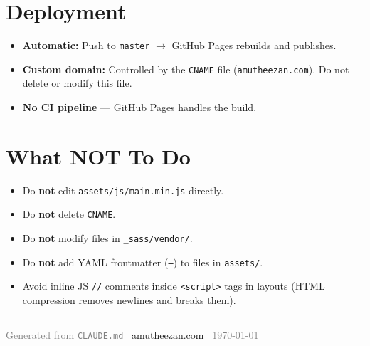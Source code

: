 \documentclass[11pt, a4paper]{article}
\begin{document}
\section{Deployment}

\begin{itemize}[leftmargin=1.5em, itemsep=2pt]
    \item \textbf{Automatic:} Push to \texttt{master} $\rightarrow$ GitHub Pages
          rebuilds and publishes.
    \item \textbf{Custom domain:} Controlled by the \texttt{CNAME} file
          (\texttt{amutheezan.com}). Do not delete or modify this file.
    \item \textbf{No CI pipeline} --- GitHub Pages handles the build.
\end{itemize}

\section{What NOT To Do}

\begin{itemize}[leftmargin=1.5em, itemsep=2pt]
    \item Do \textbf{not} edit \texttt{assets/js/main.min.js} directly.
    \item Do \textbf{not} delete \texttt{CNAME}.
    \item Do \textbf{not} modify files in \texttt{\_sass/vendor/}.
    \item Do \textbf{not} add YAML frontmatter (\texttt{---}) to files in
          \texttt{assets/}.
    \item Avoid inline JS \texttt{//} comments inside \texttt{<script>} tags in
          layouts (HTML compression removes newlines and breaks them).
\end{itemize}

\vspace{2em}
\hrule
\vspace{0.5em}
{\small\centering
    \textcolor{gray}{Generated from \texttt{CLAUDE.md} \textbullet\
    \href{https://amutheezan.com}{amutheezan.com} \textbullet\
    \today}\\
}
\end{document}
